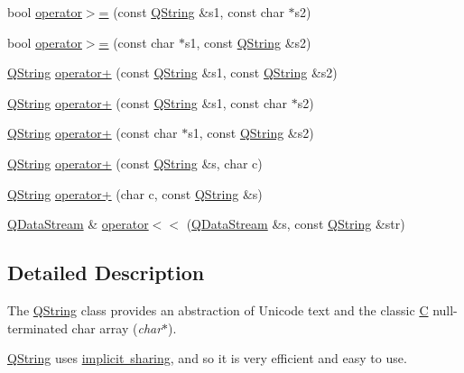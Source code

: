 \begin{DoxyCompactItemize}
\item 
bool \mbox{\hyperlink{class_q_string_a19a6ef539052453895b39db1f25ec5a2}{operator$>$=}} (const \mbox{\hyperlink{class_q_string}{Q\+String}} \&s1, const char $\ast$s2)
\item 
bool \mbox{\hyperlink{class_q_string_a9f4787df63780750a94f131e7a35ac6c}{operator$>$=}} (const char $\ast$s1, const \mbox{\hyperlink{class_q_string}{Q\+String}} \&s2)
\item 
\mbox{\hyperlink{class_q_string}{Q\+String}} \mbox{\hyperlink{class_q_string_ae485733155e818a24470bab6b39007a3}{operator+}} (const \mbox{\hyperlink{class_q_string}{Q\+String}} \&s1, const \mbox{\hyperlink{class_q_string}{Q\+String}} \&s2)
\item 
\mbox{\hyperlink{class_q_string}{Q\+String}} \mbox{\hyperlink{class_q_string_aeebc8da866e999cf9d98f409149a7274}{operator+}} (const \mbox{\hyperlink{class_q_string}{Q\+String}} \&s1, const char $\ast$s2)
\item 
\mbox{\hyperlink{class_q_string}{Q\+String}} \mbox{\hyperlink{class_q_string_ad31066c16adb556c4e773939da16a894}{operator+}} (const char $\ast$s1, const \mbox{\hyperlink{class_q_string}{Q\+String}} \&s2)
\item 
\mbox{\hyperlink{class_q_string}{Q\+String}} \mbox{\hyperlink{class_q_string_a646dae5a832bf142e3fd6eed4cd29263}{operator+}} (const \mbox{\hyperlink{class_q_string}{Q\+String}} \&s, char c)
\item 
\mbox{\hyperlink{class_q_string}{Q\+String}} \mbox{\hyperlink{class_q_string_ab79668b32f01247149267b5b77669165}{operator+}} (char c, const \mbox{\hyperlink{class_q_string}{Q\+String}} \&s)
\item 
\mbox{\hyperlink{class_q_data_stream}{Q\+Data\+Stream}} \& \mbox{\hyperlink{class_q_string_a5d8281fc5ce5c2b6e6e9fd2b9f66c32c}{operator$<$$<$}} (\mbox{\hyperlink{class_q_data_stream}{Q\+Data\+Stream}} \&s, const \mbox{\hyperlink{class_q_string}{Q\+String}} \&str)
\end{DoxyCompactItemize}


\subsection{Detailed Description}
The \mbox{\hyperlink{class_q_string}{Q\+String}} class provides an abstraction of Unicode text and the classic \mbox{\hyperlink{class_c}{C}} null-\/terminated char array ({\itshape char$\ast$}). 

\mbox{\hyperlink{class_q_string}{Q\+String}} uses \mbox{\hyperlink{}{implicit sharing}}, and so it is very efficient and easy to use.

